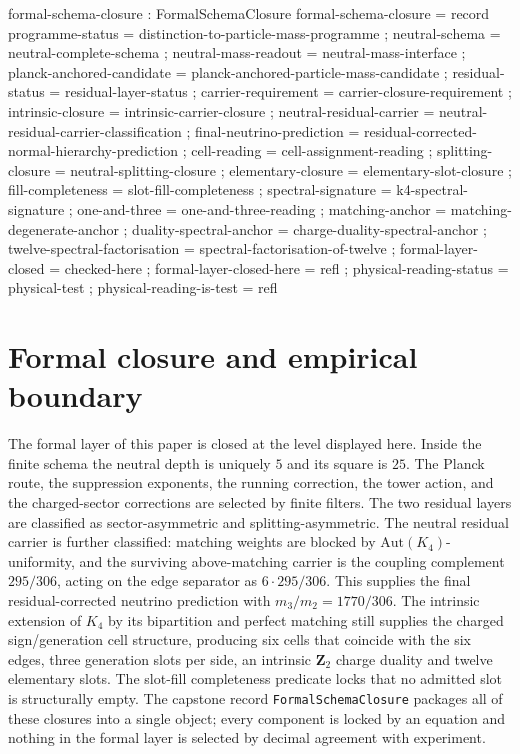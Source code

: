 \documentclass[11pt]{article}
\begin{document}
\begin{code}
formal-schema-closure : FormalSchemaClosure
formal-schema-closure = record
  { programme-status          = distinction-to-particle-mass-programme
  ; neutral-schema            = neutral-complete-schema
  ; neutral-mass-readout      = neutral-mass-interface
  ; planck-anchored-candidate = planck-anchored-particle-mass-candidate
  ; residual-status           = residual-layer-status
  ; carrier-requirement       = carrier-closure-requirement
  ; intrinsic-closure         = intrinsic-carrier-closure
  ; neutral-residual-carrier  = neutral-residual-carrier-classification
  ; final-neutrino-prediction = residual-corrected-normal-hierarchy-prediction
  ; cell-reading              = cell-assignment-reading
  ; splitting-closure         = neutral-splitting-closure
  ; elementary-closure        = elementary-slot-closure
  ; fill-completeness         = slot-fill-completeness
  ; spectral-signature        = k4-spectral-signature
  ; one-and-three             = one-and-three-reading
  ; matching-anchor           = matching-degenerate-anchor
  ; duality-spectral-anchor   = charge-duality-spectral-anchor
  ; twelve-spectral-factorisation = spectral-factorisation-of-twelve
  ; formal-layer-closed       = checked-here
  ; formal-layer-closed-here  = refl
  ; physical-reading-status   = physical-test
  ; physical-reading-is-test  = refl
  }
\end{code}

\section*{Formal closure and empirical boundary}

The formal layer of this paper is closed at the level displayed
here.  Inside the finite schema the neutral depth is uniquely $5$ and
its square is $25$.  The Planck route, the suppression exponents, the
running correction, the tower action, and the charged-sector corrections
are selected by finite filters.  The two residual layers are classified
as sector-asymmetric and splitting-asymmetric.  The neutral residual
carrier is further classified: matching weights are blocked by
$\mathrm{Aut}(K_4)$-uniformity, and the surviving above-matching carrier
is the coupling complement $295/306$, acting on the edge separator as
$6\cdot 295/306$.  This supplies the final residual-corrected neutrino
prediction with $m_3/m_2=1770/306$.  The intrinsic extension of $K_4$ by
its bipartition and perfect matching still supplies the charged
sign/generation cell structure, producing six cells that coincide with
the six edges, three generation slots per side, an intrinsic
$\mathbf{Z}_2$ charge duality and twelve elementary slots.  The slot-fill
completeness predicate locks that no admitted slot is structurally empty.
The capstone record \texttt{FormalSchemaClosure} packages all of these
closures into a single object; every component is locked by an equation
and nothing in the formal layer is selected by decimal agreement with
experiment.
\end{document}
